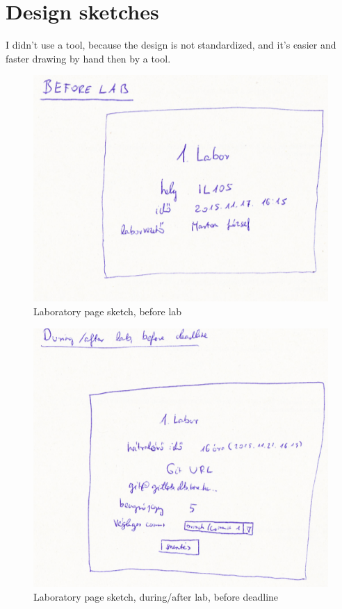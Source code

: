 \chapter{Design sketches}\label{design-sketches}
I didn't use a tool, because the design is not standardized, and it's easier and faster drawing by hand then by a tool.

%
\begin{figure}[!ht]
	\includegraphics[width=\textwidth]{figures/sketch5.png}
	\caption{Laboratory page sketch, before lab}
	\label{fig:sketch5}
\end{figure}

\begin{figure}[!ht]
	\includegraphics[width=\textwidth]{figures/sketch3.png}
	\caption{Laboratory page sketch, during/after lab, before deadline}
	\label{fig:sketch3}
\end{figure}

